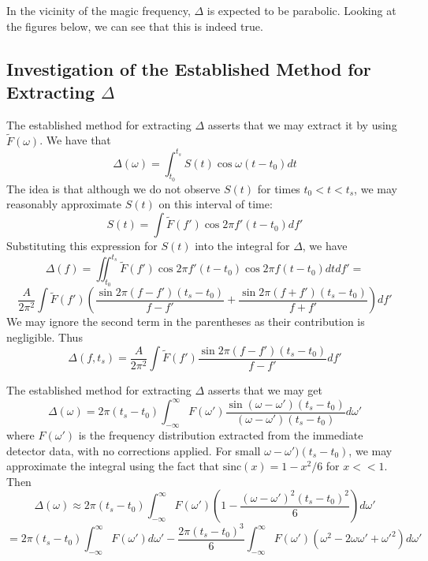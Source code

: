 In the vicinity of the magic frequency, $\Delta$ is expected to be parabolic. Looking at the figures below, we can see that this is indeed true.

\subsection{Investigation of the Established Method for Extracting $\Delta$}

The established method for extracting $\Delta$ asserts that we may extract it by using $\tilde{F}(\omega)$. We have that  \[\Delta(\omega)=\int^{t_s}_{t_0}S(t)\cos\omega(t-t_0)dt\] The idea is that although we do not observe $S(t)$ for times $t_0<t<t_s$, we may reasonably approximate $S(t)$ on this interval of time:\[S(t)=\int \tilde{F}(f')\cos2\pi f'(t-t_0)df'\] Substituting this expression for $S(t)$ into the integral for $\Delta$, we have \[\Delta(f)=\iint^{t_s}_{t_0}\tilde{F}(f')\cos2\pi f'(t-t_0)\cos2\pi f(t-t_0)dtdf'=\]\[\frac{A}{2\pi^2}\int \tilde{F}(f')\left(\frac{\sin2\pi(f-f')(t_s-t_0)}{f-f'}+\frac{\sin2\pi(f+f')(t_s-t_0)}{f+f'}\right)df'\] We may ignore the second term in the parentheses as their contribution is negligible. Thus \[\Delta(f,t_s)=\frac{A}{2\pi^2}\int \tilde{F}(f')\frac{\sin2\pi(f-f')(t_s-t_0)}{f-f'}df'\]


The established method for extracting $\Delta$ asserts that we may get \[\Delta(\omega)=2\pi(t_s-t_0)\int^{\infty}_{-\infty}F(\omega')\frac{\sin(\omega-\omega')(t_s-t_0)}{(\omega-\omega')(t_s-t_0)}d\omega'\] where $F(\omega')$ is the frequency distribution extracted from the immediate detector data, with no corrections applied. For small $\omega-\omega')(t_s-t_0)$, we may approximate the integral using the fact that $\text{sinc}(x)=1-x^2/6$ for $x<<1$. Then \[\Delta(\omega)\approx2\pi(t_s-t_0)\int^{\infty}_{-\infty}F(\omega')\left(1-\frac{(\omega-\omega')^2(t_s-t_0)^2}{6}\right)d\omega'\]\[=2\pi(t_s-t_0)\int^{\infty}_{-\infty}F(\omega')d\omega'-\frac{2\pi(t_s-t_0)^3}{6}\int^{\infty}_{-\infty}F(\omega')(\omega^2-2\omega\omega'+\omega'^2)d\omega'\]
